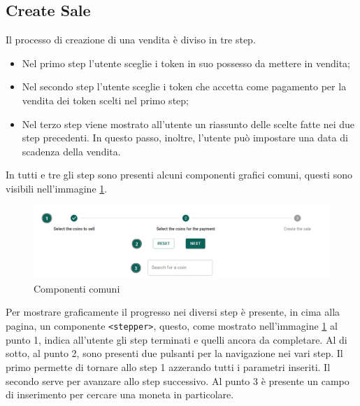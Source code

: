 \documentclass[a4paper]{article}
\begin{document}
        \subsection{Create Sale}
        Il processo di creazione di una vendita è diviso in tre step.
        \begin{itemize}
          \item Nel primo step l'utente sceglie i token in suo possesso da mettere in vendita;
          \item Nel secondo step l'utente sceglie i token che accetta come pagamento per la vendita dei token scelti nel primo step;
          \item Nel terzo step viene mostrato all'utente un riassunto delle scelte fatte nei due step precedenti. In questo passo, inoltre, l'utente può
                impostare una data di scadenza della vendita.
        \end{itemize}
        In tutti e tre gli step sono presenti alcuni componenti grafici comuni, questi sono visibili nell'immagine \ref{fig:commonComponents}.
        \begin{figure}[H]
          \includegraphics[width=\textwidth]{commonComponents.png}
          \caption{Componenti comuni}
          \centering
          \label{fig:commonComponents}
        \end{figure}
        Per mostrare graficamente il progresso nei diversi step è presente, in cima alla pagina, un componente
        \verb|<stepper>|, questo, come mostrato nell'immagine \ref{fig:commonComponents} al punto 1, indica all'utente gli step terminati e quelli ancora da completare.
        \newline
        Al di sotto, al punto 2, sono presenti due pulsanti per la navigazione nei vari step. Il primo permette di tornare allo step 1 azzerando tutti i parametri inseriti.
        Il secondo serve per avanzare allo step successivo.
        \newline
        Al punto 3 è presente un campo di inserimento per cercare una moneta in particolare.
\end{document}

